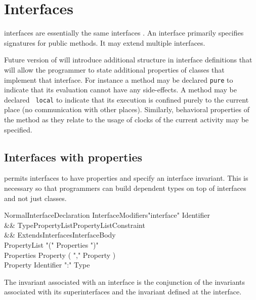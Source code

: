 \chapter{Interfaces}
\label{XtenInterfaces}

{}\XtenCurrVer{} interfaces are essentially the same \java{}
interfaces \cite[\S 9]{jls2}. An interface primarily specifies
signatures for public methods. It may extend multiple interfaces. 


Future version of \Xten{} will introduce additional structure in
interface definitions that will allow the programmer to state
additional properties of classes that implement that interface. For
instance a method may be declared {\tt pure} to indicate that its
evaluation cannot have any side-effects. A method may be declared {\tt
local} to indicate that its execution is confined purely to the
current place (no communication with other places). Similarly,
behavioral properties of the method as they relate to the usage of
clocks of the current activity may be specified.

\section{Interfaces with properties}\label{DepType:Interface}

\Xten{} permits interfaces to have properties and specify an interface
invariant. This is necessary so that programmers can build dependent
types on top of interfaces and not just classes.

\begin{grammar}
NormalInterfaceDeclaration \:
      InterfaceModifiers\opt \xcd"interface" Identifier  \\
   && TypePropertyList\opt PropertyList\opt Constraint\opt \\
   && ExtendsInterfaces\opt InterfaceBody \\
PropertyList     \: \xcd"(" Properties \xcd")" \\
Properties       \: Property ( \xcd"," Property )\star \\
Property         \: Identifier \xcd":" Type \\
\end{grammar}
The invariant associated with an interface is the conjunction of the
invariants associated with its superinterfaces and the invariant
defined at the interface. 

